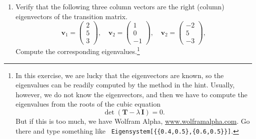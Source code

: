 \documentclass[12pt]{article}
\begin{document}
\begin{enumerate}
  \item
  \label{prob1:eigenv}
  Verify that the following three column vectors
  are the right (column) eigenvectors
  of the transition matrix.
  $$
  \mathbf v_1
  =
  \left(
    \begin{array}{r}
      2 \\
      5 \\
      3
    \end{array}
  \right),
  \quad
  \mathbf v_2
  =
  \left(
    \begin{array}{r}
      1 \\
      0 \\
      -1
    \end{array}
  \right),
  \quad
  \mathbf v_2
  =
  \left(
    \begin{array}{r}
      -2 \\
       5 \\
      -3
    \end{array}
  \right),
  $$
  Compute the corresponding eigenvalues.\footnote{
    In this exercise, we are lucky that
    the eigenvectors are known,
    so the eigenvalues can be readily computed
    by the method in the hint.
    Usually, however, we do not know the eigenvectors,
    and then we have to compute the eigenvalues from
    the roots of the cubic equation
    $$
    \det (\mathbf T - \lambda \, \mathbf I) = 0.
    $$
    But if this is too much,
    we have Wolfram Alpha, \url{www.wolframalpha.com}.
    Go there and type something like
    \texttt{
      Eigensystem[\{\{0.4,0.5\},\{0.6,0.5\}\}]}.
  }



\end{enumerate}
\end{document}
